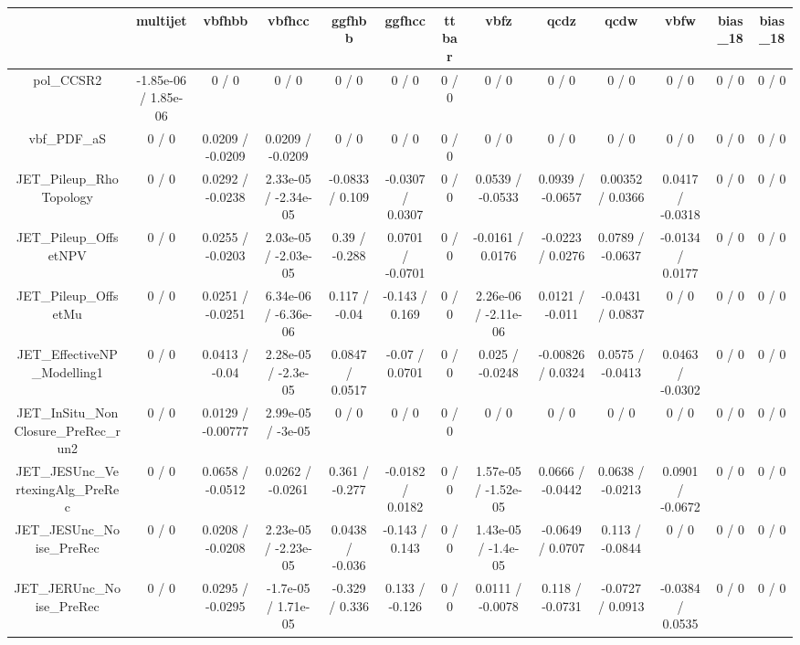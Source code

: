 \documentclass[10pt]{article}
\begin{document}
\begin{table}[htbp]
\begin{center}
\begin{tabular}{|c|c|c|c|c|c|c|c|c|c|c|c|c|}
\hline 
      & multijet      & vbfhbb      & vbfhcc      & ggfhbb      & ggfhcc      & ttbar      & vbfz      & qcdz      & qcdw      & vbfw      & bias_18      & bias_18 \\ 
\hline 
  pol_CCSR2 & -1.85e-06 / 1.85e-06 & 0 / 0 & 0 / 0 & 0 / 0 & 0 / 0 & 0 / 0 & 0 / 0 & 0 / 0 & 0 / 0 & 0 / 0 & 0 / 0 & 0 / 0 \\ 
  vbf_PDF_aS & 0 / 0 & 0.0209 / -0.0209 & 0.0209 / -0.0209 & 0 / 0 & 0 / 0 & 0 / 0 & 0 / 0 & 0 / 0 & 0 / 0 & 0 / 0 & 0 / 0 & 0 / 0 \\ 
  JET_Pileup_RhoTopology & 0 / 0 & 0.0292 / -0.0238 & 2.33e-05 / -2.34e-05 & -0.0833 / 0.109 & -0.0307 / 0.0307 & 0 / 0 & 0.0539 / -0.0533 & 0.0939 / -0.0657 & 0.00352 / 0.0366 & 0.0417 / -0.0318 & 0 / 0 & 0 / 0 \\ 
  JET_Pileup_OffsetNPV & 0 / 0 & 0.0255 / -0.0203 & 2.03e-05 / -2.03e-05 & 0.39 / -0.288 & 0.0701 / -0.0701 & 0 / 0 & -0.0161 / 0.0176 & -0.0223 / 0.0276 & 0.0789 / -0.0637 & -0.0134 / 0.0177 & 0 / 0 & 0 / 0 \\ 
  JET_Pileup_OffsetMu & 0 / 0 & 0.0251 / -0.0251 & 6.34e-06 / -6.36e-06 & 0.117 / -0.04 & -0.143 / 0.169 & 0 / 0 & 2.26e-06 / -2.11e-06 & 0.0121 / -0.011 & -0.0431 / 0.0837 & 0 / 0 & 0 / 0 & 0 / 0 \\ 
  JET_EffectiveNP_Modelling1 & 0 / 0 & 0.0413 / -0.04 & 2.28e-05 / -2.3e-05 & 0.0847 / 0.0517 & -0.07 / 0.0701 & 0 / 0 & 0.025 / -0.0248 & -0.00826 / 0.0324 & 0.0575 / -0.0413 & 0.0463 / -0.0302 & 0 / 0 & 0 / 0 \\ 
  JET_InSitu_NonClosure_PreRec_run2 & 0 / 0 & 0.0129 / -0.00777 & 2.99e-05 / -3e-05 & 0 / 0 & 0 / 0 & 0 / 0 & 0 / 0 & 0 / 0 & 0 / 0 & 0 / 0 & 0 / 0 & 0 / 0 \\ 
  JET_JESUnc_VertexingAlg_PreRec & 0 / 0 & 0.0658 / -0.0512 & 0.0262 / -0.0261 & 0.361 / -0.277 & -0.0182 / 0.0182 & 0 / 0 & 1.57e-05 / -1.52e-05 & 0.0666 / -0.0442 & 0.0638 / -0.0213 & 0.0901 / -0.0672 & 0 / 0 & 0 / 0 \\ 
  JET_JESUnc_Noise_PreRec & 0 / 0 & 0.0208 / -0.0208 & 2.23e-05 / -2.23e-05 & 0.0438 / -0.036 & -0.143 / 0.143 & 0 / 0 & 1.43e-05 / -1.4e-05 & -0.0649 / 0.0707 & 0.113 / -0.0844 & 0 / 0 & 0 / 0 & 0 / 0 \\ 
  JET_JERUnc_Noise_PreRec & 0 / 0 & 0.0295 / -0.0295 & -1.7e-05 / 1.71e-05 & -0.329 / 0.336 & 0.133 / -0.126 & 0 / 0 & 0.0111 / -0.0078 & 0.118 / -0.0731 & -0.0727 / 0.0913 & -0.0384 / 0.0535 & 0 / 0 & 0 / 0 \\ 

\end{tabular}
\end{center}
\end{table}
\end{document}

